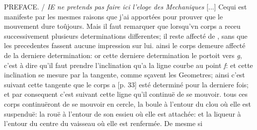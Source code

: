 \vspace*{8mm}
\pstart 
\normalsize
\noindent [Preface p. 1] PREFACE. / \textit{IE ne pretends pas faire ici l'eloge des Mechaniques} [...]
\pend 
\count{}
\pstart  
[p. 29] Cequi est manifeste par les mesmes raisons que j'ai apport\'{e}es pour prouver que le mouvement dure to\^{u}jours. Mais il faut remarquer que lorsqu'vn corps a receu successivement plusieurs determinations differentes; il reste affect\'{e} de , sans que les precedentes fassent aucune impression sur lui.
\pend 
\pstart  
[p. 32] [...] ainsi le corps demeure affect\'{e} de la derniere determination: or cette derniere determination le portoit vers \textit{g}, c'est \`{a} dire qu'il faut prendre l'inclination qu'a la ligne courbe au point \textit{f}: et cette inclination se mesure par la tangente, comme s\c{c}avent les Geometres; ainsi c'est suivant cette tangente que le corps a [p. 33] est\'{e} determin\'{e} pour la derniere fois; et par consequent c'est suivant cette ligne qu'il continu\"{e} de se mouvoir.
\pend 
\count{}
\pstart  
[p. 35] [...] tous ces corps continu\"{e}ront de se mouvoir en cercle, la boule \`{a} l'entour du clou o\`{u} elle est suspendu\"{e}: la rou\"{e} \`{a} l'entour de son essieu o\`{u} elle est attach\'{e}e: et la liqueur \`{a} l'entour du centre du vaisseau o\`{u} elle est renferm\'{e}e. De mesme si 
